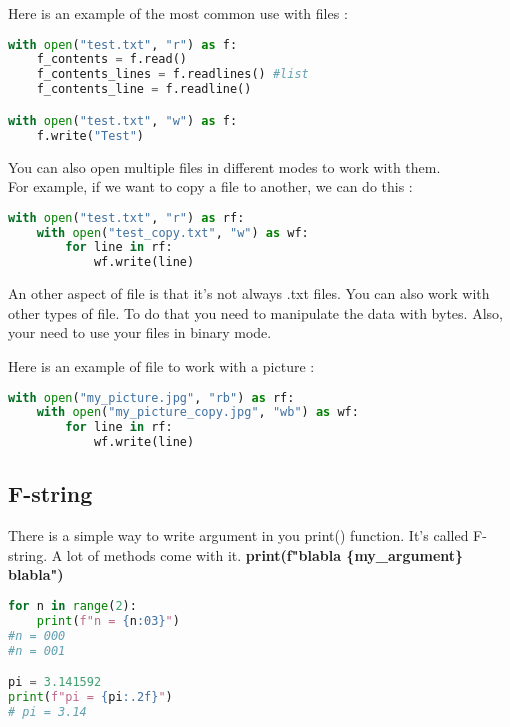 \documentclass[a4paper, 12pt, titlepage]{scrartcl} %
\begin{document}
\vspace{5mm}

Here is an example of the most common use with files :
\begin{lstlisting}[language=Python]
with open("test.txt", "r") as f:
	f_contents = f.read()
	f_contents_lines = f.readlines() #list
	f_contents_line = f.readline()

with open("test.txt", "w") as f:
	f.write("Test")
\end{lstlisting} \vspace{5mm}

You can also open multiple files in different modes to work with them. \\
For example, if we want to copy a file to another, we can do this :
\begin{lstlisting}[language=Python]
with open("test.txt", "r") as rf:
	with open("test_copy.txt", "w") as wf:
		for line in rf:
			wf.write(line)
\end{lstlisting} \vspace{5mm}

An other aspect of file is that it's not always .txt files. You can also work with other types of file. To do that you need to manipulate the data with bytes. Also, your need to use your files in binary mode.

\vspace{5mm}

Here is an example of file to work with a picture :
\begin{lstlisting}[language=Python]
with open("my_picture.jpg", "rb") as rf:
	with open("my_picture_copy.jpg", "wb") as wf:
		for line in rf:
			wf.write(line)
\end{lstlisting} \vspace{5mm}

\subsection{F-string}
\label{subsec:F-string}
There is a simple way to write argument in you print() function. It's called F-string. A lot of methods come with it. \textbf{print(f"blabla \{my\_argument\} blabla")}
\begin{lstlisting}[language=Python]
for n in range(2):
	print(f"n = {n:03}")
#n = 000
#n = 001

pi = 3.141592
print(f"pi = {pi:.2f}") 
# pi = 3.14
\end{lstlisting} \vspace{5mm}
\end{document}
